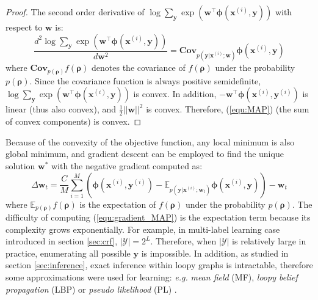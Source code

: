 \begin{proof}
    The second order derivative of $\log \sum_{\mathbf{y}} \exp(\mathbf{w}^\top \boldsymbol{\phi}(\mathbf{x}^{(i)},\mathbf{y}))$ with respect to 
    $\mathbf{w}$ is:
    \begin{equation}
    \frac{d^2 \log \sum_{\mathbf{y}} \exp(\mathbf{w}^\top \boldsymbol{\phi}(\mathbf{x}^{(i)},\mathbf{y}))}{d \mathbf{w}^2}=\mathbf{Cov}_{p(\mathbf{y}|\mathbf{x}^{(i)};\mathbf{w})}\boldsymbol{\phi}(\mathbf{x}^{(i)},\mathbf{y})
    \end{equation}
    where $\mathbf{Cov}_{p(\boldsymbol{\rho})}f(\boldsymbol{\rho})$ denotes the covariance of $f(\boldsymbol{\rho})$ under the probability $p(\boldsymbol{\rho})$. 
    Since the covariance function is always positive semidefinite, $\log \sum_{\mathbf{y}} \exp(\mathbf{w}^\top \boldsymbol{\phi}(\mathbf{x}^{(i)},\mathbf{y}))$ is convex. In addition, 
    $-\mathbf{w}^\top \boldsymbol{\phi}(\mathbf{x}^{(i)},\mathbf{y}^{(i)})$ is linear (thus also convex), and $\frac{1}{2} ||\mathbf{w}||^2$ is convex. Therefore, 
    (\ref{equ:MAP}) (the sum of convex components) is convex.  
\end{proof}
Because of the convexity of the objective function, any local minimum is also global minimum, and gradient descent can be employed to find the unique solution 
$\mathbf{w}^*$ with the negative gradient computed as: 
\begin{equation}
    \Delta \mathbf{w}_t=\frac{C}{M}\sum_{i=1}^M(\boldsymbol{\phi}(\mathbf{x}^{(i)},\mathbf{y}^{(i)})-\mathbb{E}_{p(\mathbf{y}|\mathbf{x}^{(i)};\mathbf{w}_t)} \boldsymbol{\phi}(\mathbf{x}^{(i)},\mathbf{y}))-\mathbf{w}_t 
\label{equ:gradient_MAP}
\end{equation}
where $\mathbb{E}_{p(\boldsymbol{\rho})}f(\boldsymbol{\rho})$ is the expectation of $f(\boldsymbol{\rho})$ under the probability $p(\boldsymbol{\rho})$.
The difficulty of computing (\ref{equ:gradient_MAP}) is the expectation term because its complexity grows exponentially. For example, in multi-label 
learning case introduced in section \ref{sec:crf}, $|\mathcal{Y}|=2^L$. 
Therefore, when $|\mathcal{Y}|$ is relatively large in practice, enumerating all possible $\mathbf{y}$ is impossible. 
In addition, as studied in section \ref{sec:inference}, exact inference within loopy graphs is intractable, therefore some approximations were used for learning: 
\emph{e.g.} \emph{mean field} (MF), \emph{loopy belief propagation} (LBP) or \emph{pseudo likelihood} (PL) \citep{LBP, Kumar03,CRF,Accelerated_CRF}.  



